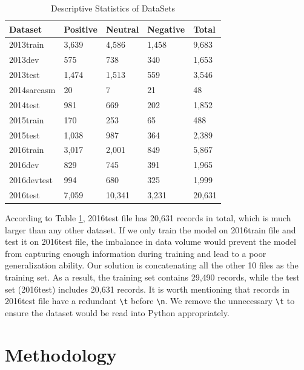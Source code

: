 \documentclass[runningheads]{llncs}
\begin{document}
\begin{table}[!ht]
	\centering
	\caption{Descriptive Statistics of DataSets} 
    \label{tab:3-stat}
	\begin{tabular}{lllll}
		\toprule
        \textbf{Dataset} & \textbf{Positive} & \textbf{Neutral} & \textbf{Negative} & \textbf{Total}\\ 
        \midrule
		2013train   & 3,639     & 4,586    & 1,458     & 9,683  \\
		2013dev     & 575      & 738     & 340      & 1,653  \\
		2013test    & 1,474     & 1,513    & 559      & 3,546  \\
		2014sarcasm & 20       & 7       & 21       & 48    \\
		2014test    & 981      & 669     & 202      & 1,852  \\
		2015train   & 170      & 253     & 65       & 488   \\
		2015test    & 1,038     & 987     & 364      & 2,389  \\
		2016train   & 3,017     & 2,001    & 849      & 5,867  \\
		2016dev     & 829      & 745     & 391      & 1,965  \\
		2016devtest & 994      & 680     & 325      & 1,999  \\
		2016test    & 7,059     & 10,341   & 3,231     & 20,631 \\ 
        \bottomrule
	\end{tabular}
\end{table}

According to Table \ref{tab:3-stat}, 2016test file has 20,631 records in total, which is much larger than any other dataset. If we only train the model on 2016train file and test it on 2016test file, the imbalance in data volume would prevent the model from capturing enough information during training and lead to a poor generalization ability. Our solution is concatenating all the other 10 files as the training set. As a result, the training set contains 29,490 records, while the test set (2016test) includes 20,631 records. It is worth mentioning that records in 2016test file have a redundant \texttt{\textbackslash t} before \texttt{\textbackslash n}. We remove the unnecessary \texttt{\textbackslash t} to ensure the dataset would be read into Python appropriately.

\section{Methodology}
\end{document}
